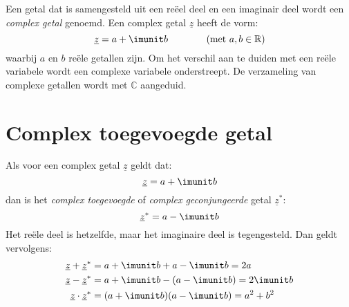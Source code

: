 Een getal dat is samengesteld uit een reëel deel en een imaginair deel wordt een \textsl{complex getal} genoemd. Een complex getal $\underline{z}$ heeft de vorm:
%
\begin{equation}
\underline{z} = a +\imunit b \qquad\qquad (\text{met } a,b \in \mathbb{R})
\end{equation}
%
waarbij $a$ en $b$ reële getallen zijn. Om het verschil aan te duiden met een reële variabele wordt een complexe variabele onderstreept. De verzameling van complexe getallen wordt met $\mathbb{C}$ aangeduid.


\section{Complex toegevoegde getal}
Als voor een complex getal $\underline{z}$ geldt dat:
%
\begin{equation}
\underline{z} = a + \imunit b
\end{equation}
%
dan is het \textsl{complex toegevoegde} of \textsl{complex geconjungeerde} getal $\underline{z}^*$:
%
\begin{equation}
\underline{z}^* = a - \imunit b
\end{equation}
%
Het reële deel is hetzelfde, maar het imaginaire deel is tegengesteld. Dan geldt vervolgens:
%
\begin{equation}
\begin{split}
\underline{z} + \underline{z}^* &= a + \imunit b + a -\imunit b = 2a \\
\underline{z} - \underline{z}^* &= a + \imunit b - (a -\imunit b) = 2\imunit b \\
\underline{z} \cdot \underline{z}^* &= (a + \imunit b)(a - \imunit b) = a^2 + b^2
\end{split}
\end{equation}


